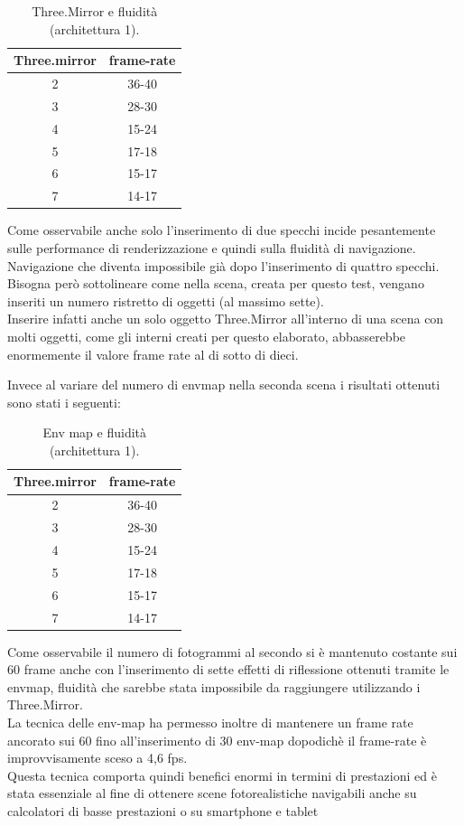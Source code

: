 \begin{table}[]
\centering
\caption{Three.Mirror e fluidità (architettura 1).}
\begin{tabular}{|c|c|}
\hline
\textbf{Three.mirror} & \textbf{frame-rate} \\ \hline
2 & 36-40 \\ \hline
3 & 28-30 \\ \hline
4 & 15-24 \\ \hline
5 & 17-18 \\ \hline
6 & 15-17 \\ \hline
7 & 14-17 \\ \hline
\end{tabular}
\label{table:three_mirror}
\end{table}

Come osservabile anche solo l’inserimento di due specchi incide pesantemente sulle performance di renderizzazione e quindi sulla fluidità di navigazione.
\\
Navigazione che diventa impossibile già dopo l’inserimento di quattro specchi.
Bisogna però sottolineare come nella scena, creata per questo test, vengano inseriti un numero ristretto di oggetti (al massimo sette).
\\
Inserire infatti anche un solo oggetto Three.Mirror all’interno di una scena con molti oggetti, come gli interni creati per questo elaborato, abbasserebbe enormemente il valore frame rate al di sotto di dieci.


Invece al variare del numero di envmap nella seconda scena i risultati ottenuti sono stati i seguenti:

\begin{table}[]
\centering
\caption{Env map e fluidità (architettura 1).}
\begin{tabular}{|c|c|}
\hline
\textbf{Three.mirror} & \textbf{frame-rate} \\ \hline
2 & 36-40 \\ \hline
3 & 28-30 \\ \hline
4 & 15-24 \\ \hline
5 & 17-18 \\ \hline
6 & 15-17 \\ \hline
7 & 14-17 \\ \hline
\end{tabular}
\label{table:env-map}
\end{table}

Come osservabile il numero di fotogrammi al secondo si è mantenuto costante sui 60 frame anche con l’inserimento di sette effetti di riflessione ottenuti tramite le envmap, fluidità che sarebbe stata impossibile da raggiungere utilizzando i Three.Mirror.
\\
La tecnica delle env-map ha permesso inoltre di mantenere un frame rate ancorato sui 60 fino all’inserimento di 30 env-map dopodichè il frame-rate è improvvisamente sceso a 4,6 fps.
\\
Questa tecnica comporta quindi benefici enormi in termini di prestazioni ed è stata essenziale al fine di ottenere scene fotorealistiche navigabili anche su calcolatori di basse prestazioni o su smartphone e tablet
